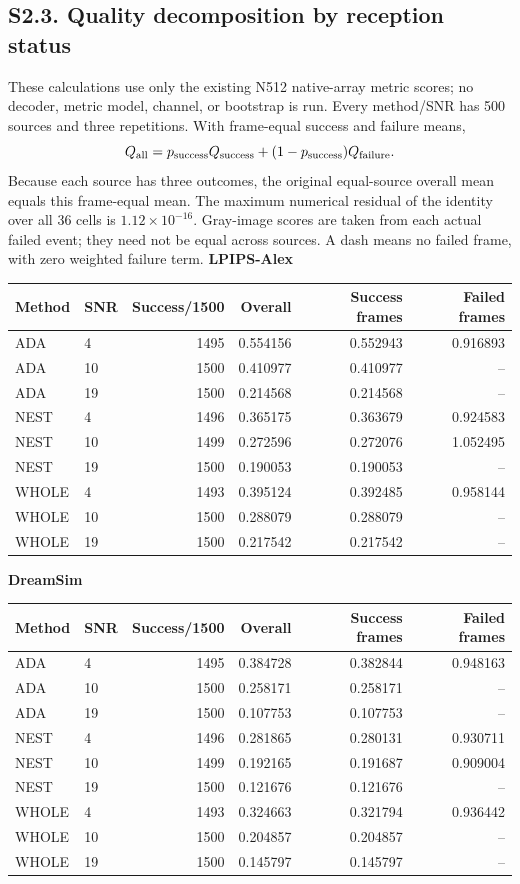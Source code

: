 \clearpage\subsection*{S2.3. Quality decomposition by reception status}
These calculations use only the existing N512 native-array metric scores; no decoder, metric model, channel, or bootstrap is run. Every method/SNR has 500 sources and three repetitions. With frame-equal success and failure means,
\[Q_{\rm all}=p_{\rm success}Q_{\rm success}+(1-p_{\rm success})Q_{\rm failure}.\]
Because each source has three outcomes, the original equal-source overall mean equals this frame-equal mean. The maximum numerical residual of the identity over all 36 cells is $1.12\times10^{-16}$. Gray-image scores are taken from each actual failed event; they need not be equal across sources. A dash means no failed frame, with zero weighted failure term.
\textbf{LPIPS-Alex}\begin{center}\small\begin{tabular}{llrrrr}\toprule Method & SNR & Success/1500 & Overall & Success frames & Failed frames\\\midrule
ADA & 4 & 1495 & 0.554156 & 0.552943 & 0.916893\\
ADA & 10 & 1500 & 0.410977 & 0.410977 & --\\
ADA & 19 & 1500 & 0.214568 & 0.214568 & --\\
NEST & 4 & 1496 & 0.365175 & 0.363679 & 0.924583\\
NEST & 10 & 1499 & 0.272596 & 0.272076 & 1.052495\\
NEST & 19 & 1500 & 0.190053 & 0.190053 & --\\
WHOLE & 4 & 1493 & 0.395124 & 0.392485 & 0.958144\\
WHOLE & 10 & 1500 & 0.288079 & 0.288079 & --\\
WHOLE & 19 & 1500 & 0.217542 & 0.217542 & --\\
\bottomrule\end{tabular}\end{center}
\textbf{DreamSim}\begin{center}\small\begin{tabular}{llrrrr}\toprule Method & SNR & Success/1500 & Overall & Success frames & Failed frames\\\midrule
ADA & 4 & 1495 & 0.384728 & 0.382844 & 0.948163\\
ADA & 10 & 1500 & 0.258171 & 0.258171 & --\\
ADA & 19 & 1500 & 0.107753 & 0.107753 & --\\
NEST & 4 & 1496 & 0.281865 & 0.280131 & 0.930711\\
NEST & 10 & 1499 & 0.192165 & 0.191687 & 0.909004\\
NEST & 19 & 1500 & 0.121676 & 0.121676 & --\\
WHOLE & 4 & 1493 & 0.324663 & 0.321794 & 0.936442\\
WHOLE & 10 & 1500 & 0.204857 & 0.204857 & --\\
WHOLE & 19 & 1500 & 0.145797 & 0.145797 & --\\
\bottomrule\end{tabular}\end{center}
